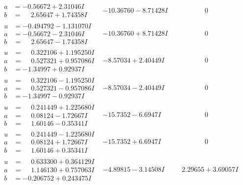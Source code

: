 \documentclass[1p]{elsarticle_modified}
\theoremstyle{definition}
\begin{document}
$$\begin{array}{c|c|c}
\begin{aligned}
a &= -0.56672 + 2.31046 I \\
b &= \phantom{-}2.65647 + 1.74358 I\end{aligned}
 & -10.36760 - 8.71428 I & \phantom{-0.000000 } 0 \\ \hline\begin{aligned}
u &= -0.494792 - 1.131070 I \\
a &= -0.56672 - 2.31046 I \\
b &= \phantom{-}2.65647 - 1.74358 I\end{aligned}
 & -10.36760 + 8.71428 I & \phantom{-0.000000 } 0 \\ \hline\begin{aligned}
u &= \phantom{-}0.322106 + 1.195250 I \\
a &= \phantom{-}0.527321 + 0.957086 I \\
b &= -1.34997 + 0.92937 I\end{aligned}
 & -8.57034 + 2.40449 I & \phantom{-0.000000 } 0 \\ \hline\begin{aligned}
u &= \phantom{-}0.322106 - 1.195250 I \\
a &= \phantom{-}0.527321 - 0.957086 I \\
b &= -1.34997 - 0.92937 I\end{aligned}
 & -8.57034 - 2.40449 I & \phantom{-0.000000 } 0 \\ \hline\begin{aligned}
u &= \phantom{-}0.241449 + 1.225680 I \\
a &= \phantom{-}0.08124 - 1.72667 I \\
b &= \phantom{-}1.60146 - 0.35341 I\end{aligned}
 & -15.7352 - 6.6947 I & \phantom{-0.000000 } 0 \\ \hline\begin{aligned}
u &= \phantom{-}0.241449 - 1.225680 I \\
a &= \phantom{-}0.08124 + 1.72667 I \\
b &= \phantom{-}1.60146 + 0.35341 I\end{aligned}
 & -15.7352 + 6.6947 I & \phantom{-0.000000 } 0 \\ \hline\begin{aligned}
u &= \phantom{-}0.633300 + 0.364129 I \\
a &= \phantom{-}1.146130 + 0.757063 I \\
b &= -0.206752 + 0.243475 I\end{aligned}
 & -4.89815 - 3.14508 I & \phantom{-}2.29655 + 3.69057 I \\ \hline\begin{aligned}

\end{aligned}
\end{array}$$
\end{document}
